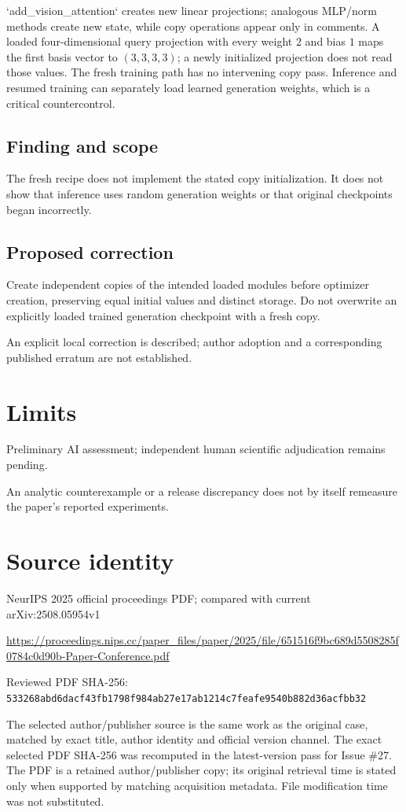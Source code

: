 \documentclass[11pt]{article}
\begin{document}
`add\_vision\_attention` creates new linear projections; analogous MLP/norm methods create new state, while copy operations appear only in comments. A loaded four-dimensional query projection with every weight \(2\) and bias \(1\) maps the first basis vector to \((3,3,3,3)\); a newly initialized projection does not read those values. The fresh training path has no intervening copy pass. Inference and resumed training can separately load learned generation weights, which is a critical countercontrol.

\subsection*{Finding and scope}

The fresh recipe does not implement the stated copy initialization. It does not show that inference uses random generation weights or that original checkpoints began incorrectly.

\subsection*{Proposed correction}

Create independent copies of the intended loaded modules before optimizer creation, preserving equal initial values and distinct storage. Do not overwrite an explicitly loaded trained generation checkpoint with a fresh copy.

An explicit local correction is described; author adoption and a corresponding published erratum are not established.

\section*{Limits}

Preliminary AI assessment; independent human scientific adjudication remains pending.\par

An analytic counterexample or a release discrepancy does not by itself remeasure the paper’s reported experiments.\par

\section*{Source identity}

NeurIPS 2025 official proceedings PDF; compared with current arXiv:2508.05954v1

\url{https://proceedings.nips.cc/paper_files/paper/2025/file/651516f9bc689d5508285f0784c0d90b-Paper-Conference.pdf}

Reviewed PDF SHA-256: \nolinkurl{533268abd6dacf43fb1798f984ab27e17ab1214c7feafe9540b882d36acfbb32}

The selected author/publisher source is the same work as the original case, matched by exact title, author identity and official version channel. The exact selected PDF SHA-256 was recomputed in the latest-version pass for Issue \#27. The PDF is a retained author/publisher copy; its original retrieval time is stated only when supported by matching acquisition metadata. File modification time was not substituted.
\end{document}
